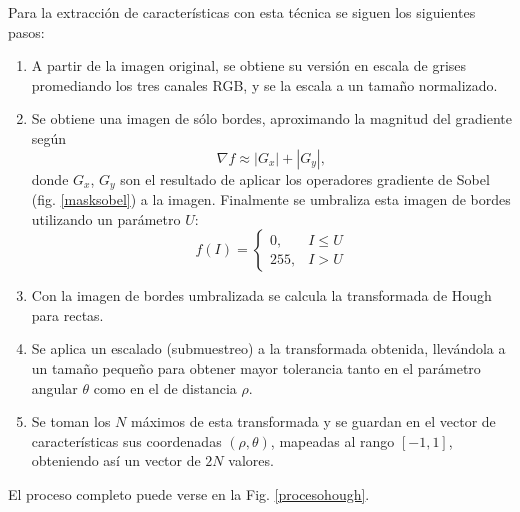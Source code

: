 \documentclass[conference,a4paper,10pt,oneside,final]{tfmpd}
\begin{document}
Para la extracción de características con esta técnica se siguen los siguientes
pasos:
\begin{enumerate}
\item A partir de la imagen original, se obtiene su versión en escala de grises
      promediando los tres canales RGB, y se la escala a un tamaño normalizado.
\item Se obtiene una imagen de sólo bordes, aproximando la magnitud del
      gradiente según
      \begin{equation}
      \label{sob}
      \nabla f \approx |G_x| + |G_y|,
      \end{equation}
      donde $G_x$, $G_y$ son el resultado de aplicar los o\-pe\-ra\-do\-res
      gradiente  de Sobel (fig. \ref{masksobel}) a la imagen. 
      Finalmente se umbraliza esta imagen de bordes %
      utilizando un parámetro $U$:
      \begin{equation}
      \label{umbral}
      f(I)=
      \begin{cases}
      0, & I\leq U\\
      255, & I > U
      \end{cases}
      \end{equation}
\item Con la imagen de bordes umbralizada se calcula la transformada de
      Hough para rectas.
\item Se aplica un escalado (submuestreo) a la transformada obtenida, llevándola
      a un tamaño pequeño %
      para obtener mayor tolerancia tanto en el parámetro angular
      $\theta$ como en el de distancia $\rho$.
\item Se toman los $N$ máximos de esta transformada y se guardan en el vector de
      características sus coordenadas $(\rho,\theta)$, mapeadas al rango
      $[-1,1]$, obteniendo así un vector de $2N$ valores.
\end{enumerate}
El proceso completo puede verse en la Fig. \ref{procesohough}.
\end{document}
